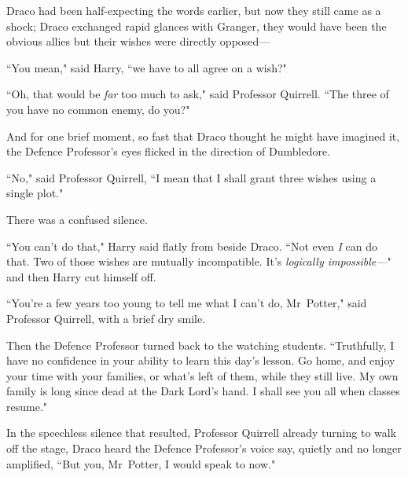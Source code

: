 Draco had been half-expecting the words earlier, but now they still came as a shock; Draco exchanged rapid glances with Granger, they would have been the obvious allies but their wishes were directly opposed—

``You mean," said Harry, ``we have to all agree on a wish?"

``Oh, that would be \emph{far} too much to ask," said Professor Quirrell. ``The three of you have no common enemy, do you?"

And for one brief moment, so fast that Draco thought he might have imagined it, the Defence Professor's eyes flicked in the direction of Dumbledore.

``No," said Professor Quirrell, ``I mean that I shall grant three wishes using a single plot."

There was a confused silence.

``You can't do that," Harry said flatly from beside Draco. ``Not even \emph{I} can do that. Two of those wishes are mutually incompatible. It's \emph{logically impossible—}" and then Harry cut himself off.

``You're a few years too young to tell me what I can't do, Mr~Potter," said Professor Quirrell, with a brief dry smile.

Then the Defence Professor turned back to the watching students. ``Truthfully, I have no confidence in your ability to learn this day's lesson. Go home, and enjoy your time with your families, or what's left of them, while they still live. My own family is long since dead at the Dark Lord's hand. I shall see you all when classes resume."

In the speechless silence that resulted, Professor Quirrell already turning to walk off the stage, Draco heard the Defence Professor's voice say, quietly and no longer amplified, ``But you, Mr~Potter, I would speak to now."

